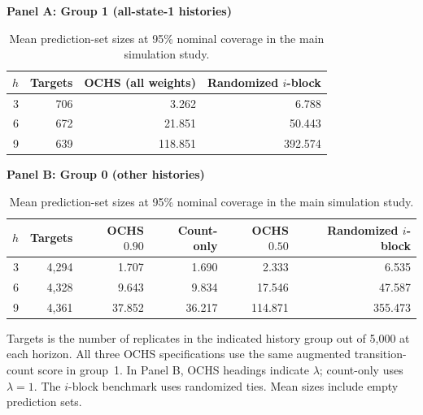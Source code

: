 \begin{table}[H]
\centering
\caption{Mean prediction-set sizes at 95\% nominal coverage in the
main simulation study.}
\label{tab:results-size-95}
\begingroup
\small
\setlength{\tabcolsep}{4pt}
\renewcommand{\arraystretch}{1.07}
\textbf{Panel A: Group 1 (all-state-1 histories)}\\[3pt]
\begin{tabular}{@{}rrrr@{}}
\toprule
$h$ & Targets & OCHS (all weights) & Randomized $i$-block \\
\midrule
3 & 706 & 3.262 & 6.788 \\
6 & 672 & 21.851 & 50.443 \\
9 & 639 & 118.851 & 392.574 \\
\bottomrule
\end{tabular}
\par\vspace{9pt}
\textbf{Panel B: Group 0 (other histories)}\\[3pt]
\begin{tabular}{@{}rrrrrr@{}}
\toprule
$h$ & Targets & OCHS $0.90$ & Count-only & OCHS $0.50$ & Randomized $i$-block \\
\midrule
3 & 4,294 & 1.707 & 1.690 & 2.333 & 6.535 \\
6 & 4,328 & 9.643 & 9.834 & 17.546 & 47.587 \\
9 & 4,361 & 37.852 & 36.217 & 114.871 & 355.473 \\
\bottomrule
\end{tabular}
\par\vspace{5pt}
\begin{minipage}{0.97\linewidth}
\footnotesize
Targets is the number of replicates in the indicated history group
out of 5,000 at each horizon. All three OCHS specifications use the
same augmented transition-count score in group~1. In Panel B,
OCHS headings indicate $\lambda$; count-only uses $\lambda=1$.
The $i$-block benchmark uses randomized ties. Mean sizes include
empty prediction sets.
\end{minipage}
\endgroup
\end{table}
